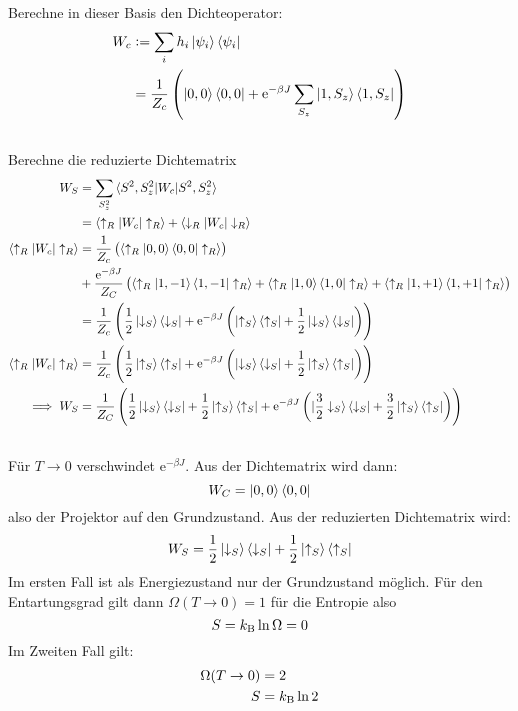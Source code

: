 Berechne in dieser Basis den Dichteoperator:
\begin{align*}
W_c &:= \sum_i h_i \ket{\psi_i}\bra{\psi_i} \\
&= \frac{1}{Z_c} \del{\ket{0,0}\bra{0,0}+\mathrm{e}^{-\beta J} \sum_{S_z} \ket{1,S_z}\bra{1,S_z}} 
\end{align*}


\subsection{}
Berechne die reduzierte Dichtematrix
\begin{align*}
W_S &= \sum_{S^2_z} \braket{S^2,S^2_z | W_c | S^2,S^2_z} \\
&= \braket{\uparrow_R | W_c | \uparrow_R} + \braket{\downarrow_R | W_c | \downarrow_R}  \\
\braket{\uparrow_R | W_c | \uparrow_R} &= \frac{1}{Z_c} \del{ \braket{\uparrow_R | 0,0}\braket{0,0 | \uparrow_R}} \\
&+ \frac{\mathrm{e}^{-\beta J}}{Z_C} \del{ \braket{\uparrow_R | 1,-1}\braket{1,-1 | \uparrow_R} + \braket{\uparrow_R | 1,0}\braket{1,0 | \uparrow_R} + \braket{\uparrow_R | 1,+1}\braket{1,+1 | \uparrow_R} } \\
&=\frac{1}{Z_c}\del{\frac{1}{2}\ket{\downarrow_S} \bra{\downarrow_S} +  \mathrm{e}^{-\beta J} \del{ \ket{\uparrow_S}\bra{\uparrow_S} + \frac{1}{2} \ket{\downarrow_S}\bra{\downarrow_S}}} \\
\braket{\uparrow_R | W_c | \uparrow_R} &= \frac{1}{Z_c}\del{\frac{1}{2}\ket{\uparrow_S} \bra{\uparrow_S} +  \mathrm{e}^{-\beta J} \del{ \ket{\downarrow_S}\bra{\downarrow_S} + \frac{1}{2} \ket{\uparrow_S}\bra{\uparrow_S}}} \\
\implies W_S &= \frac{1}{Z_C} \del{ \frac{1}{2}\ket{\downarrow_S} \bra{\downarrow_S} + \frac{1}{2}\ket{\uparrow_S} \bra{\uparrow_S} + \mathrm{e}^{-\beta J}\del{\ket{ \frac{3}{2} \downarrow_S}\bra{\downarrow_S} + \frac{3}{2} \ket{\uparrow_S}\bra{\uparrow_S}}}
\end{align*}


\subsection{}
Für $T \longrightarrow 0$ verschwindet $\mathrm{e}^{-\beta J}$. Aus der Dichtematrix wird dann:
\[W_C= \ket{0,0}\bra{0,0} \] also der Projektor auf den Grundzustand.
Aus der reduzierten Dichtematrix wird:
\[W_S = \frac{1}{2}\ket{\downarrow_S} \bra{\downarrow_S} + \frac{1}{2}\ket{\uparrow_S} \bra{\uparrow_S} \]
Im ersten Fall ist als Energiezustand nur der Grundzustand möglich. Für den Entartungsgrad gilt dann $\Omega(T\rightarrow 0)=1$ für die Entropie also \[S=k_{\text B} \ln \Omega =0 \]
Im Zweiten Fall gilt:
\begin{align*}
\Omega(T\rightarrow 0) &= 2 \\
S &=k_{\text B} \ln 2
\end{align*}


\IfFileExists{\bibliographyfile}{
    \printbibliography
}{}



